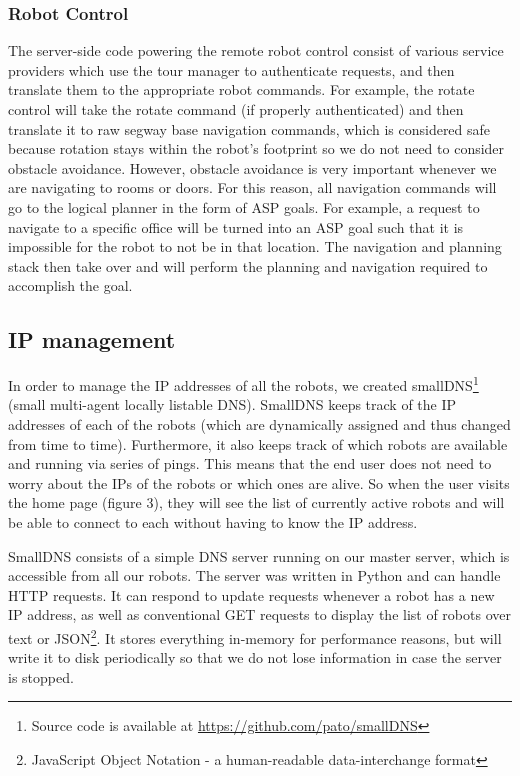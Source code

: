 \documentclass[
  oneside,
  11pt, a4paper,
  footinclude=true,
  headinclude=true,
  cleardoublepage=empty
]{article}
\begin{document}
\subsubsection{Robot Control}

The server-side code powering the remote robot control consist of various
service providers which use the tour manager to authenticate requests, and then
translate them to the appropriate robot commands. For example, the rotate control
will take the rotate command (if properly authenticated) and then translate it
to raw segway base navigation commands, which is considered safe because
rotation stays within the robot's footprint so we do not need to consider
obstacle avoidance. However, obstacle avoidance is very important whenever we
are navigating to rooms or doors. For this reason, all navigation commands will
go to the logical planner in the form of ASP goals. For example, a request to
navigate to a specific office will be turned into an ASP goal such that it is
impossible for the robot to not be in that location. The navigation and
planning stack then take over and will perform the planning and navigation
required to accomplish the goal.

\subsection{IP management}

In order to manage the IP addresses of all the robots, we created
smallDNS\footnote{Source code is available at
\url{https://github.com/pato/smallDNS}} (small multi-agent locally listable
DNS). SmallDNS keeps track of the IP addresses of each of the robots (which are
dynamically assigned and thus changed from time to time). Furthermore, it also
keeps track of which robots are available and running via series of pings. This
means that the end user does not need to worry about the IPs of the robots or
which ones are alive. So when the user visits the home page (figure 3), they
will see the list of currently active robots and will be able to connect to
each without having to know the IP address.

SmallDNS consists of a simple DNS server running on our master server, which is
accessible from all our robots. The server was written in Python and can
handle HTTP requests. It can respond to update requests whenever a robot has
a new IP address, as well as conventional GET requests to display the list of
robots over text or JSON\footnote{JavaScript Object Notation - a human-readable
data-interchange format}. It stores everything in-memory for performance
reasons, but will write it to disk periodically so that we do not lose
information in case the server is stopped.
\end{document}
